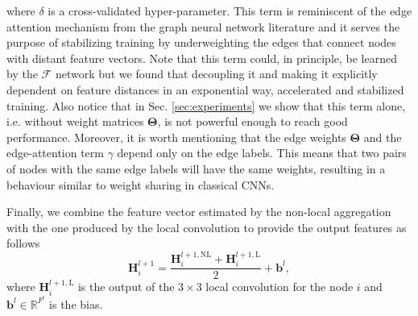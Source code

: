 \documentclass[journal]{IEEEtran}
\newcommand{\Hb}{\mathbf{H}}
\newcommand{\fun}{\mathcal{F}}
\newcommand{\RR}{\mathbb{R}}
\begin{document}
where $\delta$ is a cross-validated hyper-parameter. This term is reminiscent of the edge attention mechanism from the graph neural network literature \cite{gong2019exploiting} and it serves the purpose of stabilizing training by underweighting the edges that connect nodes with distant feature vectors. Note that this term could, in principle, be learned by the $\fun$ network but we found that decoupling it and making it explicitly dependent on feature distances in an exponential way, accelerated and stabilized training. Also notice that in Sec. \ref{sec:experiments} we show that this term alone, i.e. without weight matrices $\bm{\Theta}$, is not powerful enough to reach good performance. Moreover, it is worth mentioning that the edge weights $\bm{\Theta}$ and the edge-attention term $\gamma$ depend only on the edge labels. This means that two pairs of nodes with the same edge labels will have the same weights, resulting in a behaviour similar to weight sharing in classical CNNs.

Finally, we combine the feature vector estimated by the non-local aggregation with the one produced by the local convolution to provide the output features as follows
\[
\Hb_i^{l+1}=\frac{\Hb_i^{l+1,\mathrm{NL}}+\Hb_i^{l+1,\mathrm{L}}}{2}+\mathbf{b}^l,
\]
where $\Hb_i^{l+1,\mathrm{L}}$ is the output of the $3\times 3$ local convolution for the node $i$ and $\mathbf{b}^l\in\RR^{F^l}$ is the bias.
\end{document}
